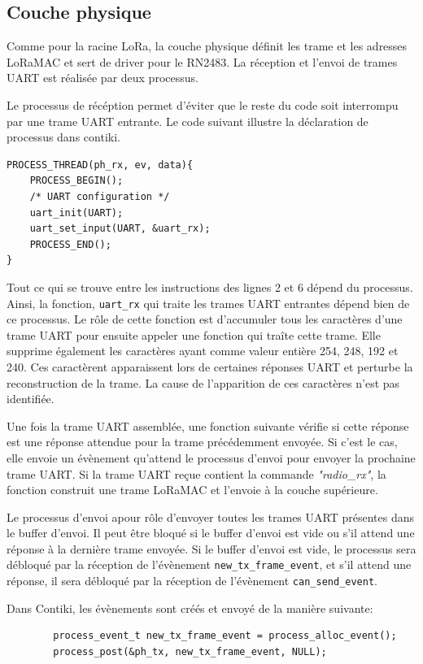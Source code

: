 \subsection*{Couche physique}
    Comme pour la racine LoRa, la couche physique définit les trame et les adresses LoRaMAC et sert 
    de driver pour le RN2483. La réception et l'envoi de trames UART est réalisée par deux 
    processus.

    Le processus de récéption permet d'éviter que le reste du code soit interrompu par une trame 
    UART entrante. Le code suivant illustre la déclaration de processus dans contiki.  

    \begin{verbatim}
PROCESS_THREAD(ph_rx, ev, data){
    PROCESS_BEGIN();
    /* UART configuration */
    uart_init(UART);
    uart_set_input(UART, &uart_rx);
    PROCESS_END();
}
    \end{verbatim}
    Tout ce qui se trouve entre les instructions des lignes 2 et 6 dépend du processus. Ainsi, la 
    fonction, \texttt{uart\_rx} qui traite les trames UART entrantes dépend bien de ce processus.
    Le rôle de cette fonction est d'accumuler tous les caractères d'une trame UART pour ensuite 
    appeler une fonction qui traîte cette trame. Elle supprime également les caractères ayant comme 
    valeur entière 254, 248, 192 et 240. Ces caractèrent apparaissent lors de certaines réponses 
    UART et perturbe la reconstruction de la trame. La cause de l'apparition de ces caractères 
    n'est pas identifiée.

    Une fois la trame UART assemblée, une fonction suivante vérifie si cette réponse est une 
    réponse attendue pour la trame précédemment envoyée. Si c'est le cas, elle envoie un évènement 
    qu'attend le processus d'envoi pour envoyer la prochaine trame UART. Si la trame UART reçue 
    contient la commande \textit{"radio\_rx"}, la fonction construit une trame LoRaMAC et l'envoie 
    à la couche supérieure.

    Le processus d'envoi apour rôle d'envoyer toutes les trames UART présentes dans le buffer 
    d'envoi. Il peut être bloqué si le buffer d'envoi est vide ou s'il attend une réponse à la 
    dernière trame envoyée. Si le buffer d'envoi est vide, le processus sera débloqué par la 
    réception de l'évènement \texttt{new\_tx\_frame\_event}, et s'il attend une réponse, il sera 
    débloqué par la réception de l'évènement \texttt{can\_send\_event}.

    Dans Contiki, les évènements sont créés et envoyé de la manière suivante:
    \begin{verbatim}
        process_event_t new_tx_frame_event = process_alloc_event();
        process_post(&ph_tx, new_tx_frame_event, NULL);
    \end{verbatim}
    
